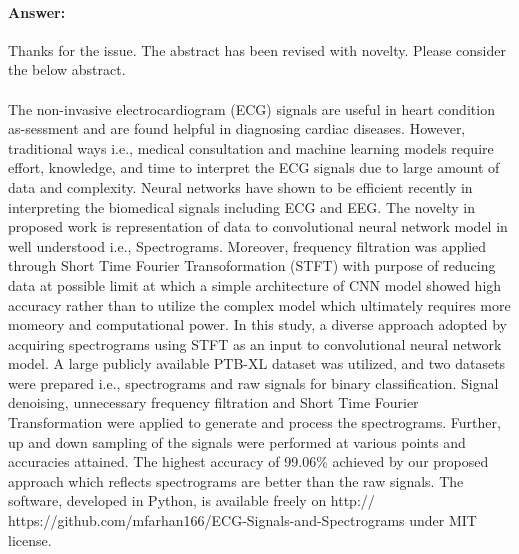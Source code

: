 \documentclass{article}
\begin{document}
\paragraph{Answer:}
Thanks for the issue. The abstract has been revised with novelty. Please consider the below abstract. \\ \\ The non-invasive electrocardiogram (ECG) signals are useful in heart condition as-sessment and are found helpful in diagnosing cardiac diseases. However, traditional ways i.e., medical consultation and machine learning models require effort, knowledge, and time to interpret the ECG signals due to large amount of data and complexity. Neural networks have shown to be efficient recently in interpreting the biomedical signals including ECG and EEG. The novelty in proposed work is representation of data to convolutional neural network model in well understood i.e., Spectrograms. Moreover, frequency filtration was applied through Short Time Fourier Transoformation (STFT) with purpose of reducing data at possible limit at which a simple architecture of CNN model showed high accuracy rather than to utilize the complex model which ultimately requires more momeory and computational power. In this study, a diverse approach adopted by acquiring spectrograms using STFT as an input to convolutional neural network model. A large publicly available PTB-XL dataset was utilized, and two datasets were prepared i.e., spectrograms and raw signals for binary classification. Signal denoising, unnecessary frequency filtration and Short Time Fourier Transformation were applied to generate and process the spectrograms. Further, up and down sampling of the signals were performed at various points and accuracies attained. The highest accuracy of 99.06\% achieved by our proposed approach which reflects spectrograms are better than the raw signals. The software, developed in Python, is available freely on http:// https://github.com/mfarhan166/ECG-Signals-and-Spectrograms under MIT license.
\end{document}
